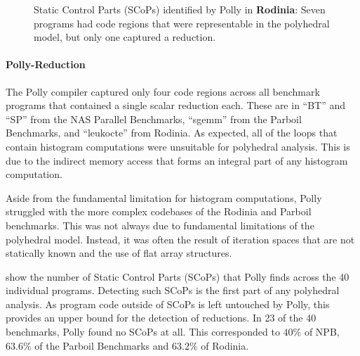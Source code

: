 \begin{figure}[p]
    \caption{Static Control Parts (SCoPs) identified by Polly in {\bf Rodinia}:
             Seven programs had code regions that were representable in
             the polyhedral model, but only one captured a reduction.}
    \label{rodinia_scops}
\end{figure}

    \paragraph*{Polly-Reduction}
    The Polly compiler captured only four code regions across all benchmark
    programs that contained a single scalar reduction each.
    These are in ``BT'' and ``SP'' from the NAS Parallel Benchmarks,
    ``sgemm'' from the Parboil Benchmarks, and ``leukocte'' from Rodinia.
    As expected, all of the loops that contain histogram computations were
    unsuitable for polyhedral analysis.
    This is due to the indirect memory access that forms an integral part of any
    histogram computation.

    Aside from the fundamental limitation for histogram computations, Polly
    struggled with the more complex codebases of the Rodinia and Parboil
    benchmarks.
    This was not always due to fundamental limitations of the polyhedral model.
    Instead, it was often the result of iteration spaces that are not statically
    known and the use of flat array structures.

     show the number of Static
    Control Parts (SCoPs) that Polly finds across the 40 individual programs.
    Detecting such SCoPs is the first part of any polyhedral analysis.
    As program code outside of SCoPs is left untouched by Polly, this provides
    an upper bound for the detection of reductions.
    In 23 of the 40 benchmarks, Polly found no
    SCoPs at all.  This corresponded to $40\%$ of NPB, $63.6\%$ of the
    Parboil Benchmarks and $63.2\%$ of Rodinia.

